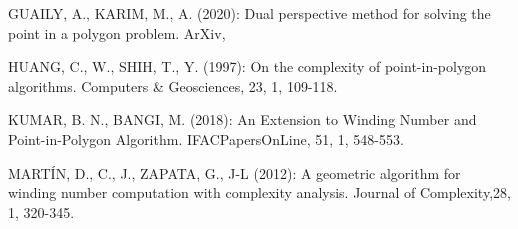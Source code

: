 \documentclass[15pt]{article}
\begin{document}
\begin{spacing}{1.5}
\noindent GUAILY, A., KARIM, M., A. (2020): Dual perspective method for solving the point in a polygon problem. ArXiv, 

\noindent HUANG, C., W., SHIH, T., Y. (1997): On the complexity of point-in-polygon algorithms. Computers \& Geosciences, 23, 1, 109-118. 

\noindent KUMAR, B. N., BANGI, M. (2018): An Extension to Winding Number and Point-in-Polygon Algorithm. IFACPapersOnLine, 51, 1, 548-553. 

\noindent MARTÍN, D., C., J., ZAPATA, G., J-L (2012): A geometric algorithm for winding number computation with complexity analysis. Journal of Complexity,28, 1, 320-345.

\end{spacing}
\end{document}
